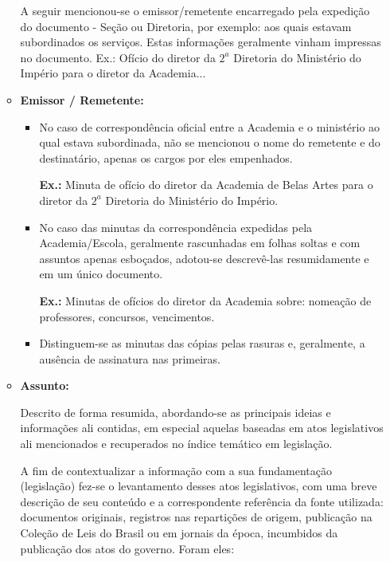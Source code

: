 \begin{itemize}
\begin{itemize}
		A seguir mencionou-se o emissor/remetente encarregado pela expedição do documento - Seção ou Diretoria, por exemplo: aos quais estavam subordinados os serviços. Estas informações geralmente vinham impressas no documento. Ex.: Ofício do diretor da $2^a$ Diretoria do Ministério do Império para o diretor da Academia...
		
		\item \textbf{Emissor / Remetente:}
		\begin{itemize}
			\item No caso de correspondência oficial entre a Academia e o ministério ao qual estava subordinada, não se mencionou o nome do remetente e do destinatário, apenas os cargos por eles empenhados.
			
			\textbf{Ex.:} Minuta de ofício do diretor da Academia de Belas Artes para o diretor da $2^a$ Diretoria do Ministério do Império.
		
			\item No caso das minutas da correspondência expedidas pela Academia/Escola, geralmente rascunhadas em folhas soltas e com assuntos apenas esboçados, adotou-se descrevê-las resumidamente e em um único documento.
			
			\textbf{Ex.:} Minutas de ofícios do diretor da Academia sobre: nomeação de professores, concursos, vencimentos.
			
			\item Distinguem-se as minutas das cópias pelas rasuras e, geralmente, a ausência de assinatura nas primeiras.
		\end{itemize}
		
		\item \textbf{Assunto:}
		
		Descrito de forma resumida, abordando-se as principais ideias e informações ali contidas, em especial aquelas baseadas em atos legislativos ali mencionados e recuperados no índice temático em legislação.
		
		A fim de contextualizar a informação com a sua fundamentação (legislação) fez-se o levantamento desses atos legislativos, com uma breve descrição de seu conteúdo e a correspondente referência da fonte utilizada: documentos originais, registros nas repartições de origem, publicação na Coleção de Leis do Brasil ou em jornais da época, incumbidos da publicação dos atos do governo. Foram eles:
		

\end{itemize}
\end{itemize}

